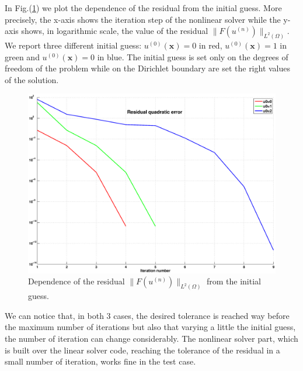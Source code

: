 In Fig.(\ref{fig:bratu_norm}) we plot the dependence of the residual from the initial guess. More precisely, the x-axis shows the iteration step of the nonlinear solver while the y-axis shows, in logarithmic scale, the value of the residual $\|F(u^{(n)})\|_{L^2(\Omega)}$. We report three different initial guess: $u^{(0)}(\mathbf{x})=0$ in red, $u^{(0)}(\mathbf{x})=1$ in green and $u^{(0)}(\mathbf{x})=0$ in blue. The initial guess is set only on the degrees of freedom of the problem while on the Dirichlet boundary are set the right values of the solution.

\begin{figure}
\centering
\includegraphics[scale=0.3]{images/bratu_norm.eps}
\caption{Dependence of the residual $\|F(u^{(n)})\|_{L^2(\Omega)}$ from the initial guess.}\label{fig:bratu_norm}
\end{figure}

We can notice that, in both 3 cases, the desired tolerance is reached way before the maximum number of iterations but also that varying a little the initial guess, the number of iteration can change considerably. The nonlinear solver part, which is built over the linear solver code, reaching the tolerance of the residual in a small number of iteration, works fine in the test case.

